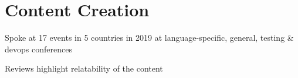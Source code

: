 \documentclass[letterpaper]{deedy-resume} %
\begin{document}
\begin{minipage}[t]{0.66\textwidth}
%
%
%
%
%
%
%
%


\section{Content Creation}


\vspace{\topsep} %
\begin{tightitemize}
\item Spoke at 17 events in 5 countries in 2019 at language-specific, general, testing \& devops conferences
\item Reviews highlight relatability of the content
\end{tightitemize}


\end{minipage}
\end{document}
